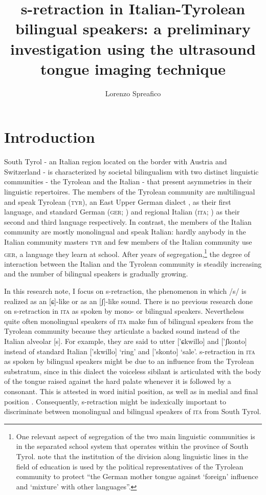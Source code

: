 \documentclass[output=paper]{LSP/langsci}
\author{Lorenzo Spreafico\affiliation{Free University of Bozen-Bolzano}}
\title{s-retraction in Italian-Tyrolean bilingual speakers: a preliminary investigation using the ultrasound tongue imaging technique}
\begin{document}
  
\section{Introduction}
South Tyrol - an Italian region located on the border with Austria and Switzerland - is characterized by societal bilingualism with two distinct linguistic communities - the Tyrolean and the Italian - that present asymmetries in their linguistic repertoires. The members of the Tyrolean community are multilingual and speak Tyrolean (\textsc{tyr}), an East Upper German dialect \citep{wiesinger_einteilung_1983,russ_central_1990}, as their first language, and standard German (\textsc{ger}; \citealt{ciccolone_lo_2010}) and regional Italian (\textsc{ita}; \citealt{mioni_litaliano_2001}) as their second and third language respectively. In contrast, the members of the Italian community are mostly monolingual and speak Italian: hardly anybody in the Italian community masters \textsc{tyr} and few members of the Italian community use \textsc{ger}, a language they learn at school. After years of segregation,\footnote{One relevant aspect of segregation of the two main linguistic communities is in the separated school system that operates within the province of South Tyrol. \citet[237]{woelk_educational_2008} note that the institution of the division along linguistic lines in the field of education is used by the political representatives of the Tyrolean community to protect “the German mother tongue against `foreign' influence and `mixture' with other languages”.} the degree of interaction between the Italian and the Tyrolean community is steadily increasing and the number of bilingual speakers is gradually growing.

In this research note, I focus on s-retraction, the phenomenon in which /s/ is realized as an [ɕ]-like or as an [ʃ]-like sound. There is no previous research done on s-retraction in \textsc{ita} as spoken by mono- or bilingual speakers. Nevertheless quite often monolingual speakers of \textsc{ita} make fun of bilingual speakers from the Tyrolean community because they articulate a backed sound instead of the Italian alveolar [s]. For example, they are said to utter ['ɕkwillo] and ['ʃkonto] instead of standard Italian ['skwillo] `ring' and ['skonto] `sale'. s-retraction in \textsc{ita} as spoken by bilingual speakers might be due to an influence from the Tyrolean substratum, since in this dialect the voiceless sibilant is articulated with the body of the tongue raised against the hard palate whenever it is followed by a consonant. This is attested in word initial position, as well as in medial and final position \citep{alber_regional_2001,alber_silbenonset_2005}. Consequently, s-retraction might be indexically important to discriminate between monolingual and bilingual speakers of \textsc{ita} from South Tyrol.
\end{document}
